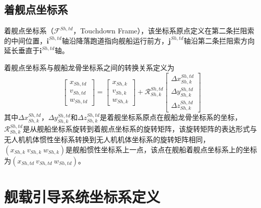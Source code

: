 \subsection{着舰点坐标系}
着舰点坐标系（$\mathcal{F}^{Sh,td}$，Touchdown Frame），该坐标系原点定义在第二条拦阻索的中间位置，$\mathbf{i}^{Sh,td}$轴沿降落跑道指向舰船运行前方，$\mathbf{j}^{Sh,td}$轴沿第二条拦阻索方向延长垂直于$\mathbf{i}^{Sh,td}$轴。

着舰点坐标系与舰船龙骨坐标系之间的转换关系定义为
\begin{equation}
\begin{bmatrix} x_{Sh,td} \\ v_{Sh,td} \\w_{Sh,td} \end{bmatrix} = \begin{bmatrix} x_{Sh,k} \\ v_{Sh,k} \\w_{Sh,k} \end{bmatrix} +\mathcal{R}_{Sh,k}^{Sh,td} \begin{bmatrix} \Delta x_{Sh,k}^{Sh,td} \\ \Delta y_{Sh,k}^{Sh,td} \\ \Delta z_{Sh,k}^{Sh,td} 
\end{bmatrix}
\end{equation}
其中$\Delta x_{Sh,k}^{Sh,td}$，$\Delta y_{Sh,k}^{Sh,td}$和$\Delta z_{Sh,k}^{Sh,td}$是着舰坐标系原点在舰船龙骨坐标系的坐标，$\mathcal{R}_{Sh,k}^{Sh,td}$是从舰船坐标系旋转到着舰点坐标系的旋转矩阵，该旋转矩阵的表达形式与无人机机体惯性坐标系转换到无人机机体坐标系的旋转矩阵相同，$(x_{Sh,k}\ v_{Sh,k}\ w_{Sh,k})$是舰船惯性坐标系上一点，该点在舰船着舰点坐标系上的坐标为$(x_{Sh,td}\ v_{Sh,td}\ w_{Sh,td})$。


\section{舰载引导系统坐标系定义}









